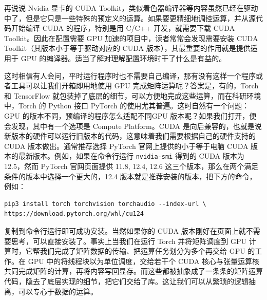 再说说 Nvidia 显卡的 CUDA Toolkit，类似着色器编译器等内容虽然已经在驱动中了，但是它只是一些特殊的预定义的运算。如果要更精细地调控运算，并从源代码开始编译 CUDA 的程序，特别是用 C/C++ 开发，就需要下载 CUDA Toolkit。因此在配置需要 GPU 加速的项目中，读者常常会发现需要安装 CUDA Toolkit（其版本小于等于驱动对应的 CUDA 版本），其最重要的作用就是提供适用于 GPU 的编译器。适当了解对理解配置环境时干了什么是有益的。

这时相信有人会问，平时运行程序时也不需要自己编译，那有没有这样一个程序或者工具可以让我们开箱即用地使用 GPU 完成矩阵运算呢？答案是，有的，Torch 和 TensorFlow 就包装掉了底层的细节，可以方便地完成这些运算，而在科研环境中，Torch 的 Python 接口 PyTorch 的使用尤其普遍。这时自然有一个问题：GPU 的版本不同，预编译的程序怎么适配不同GPU 版本呢？如果我们打开，便会发现，其中有一个选项是 Compute Platform。CUDA 是向后兼容的，也就是说新版本的硬件可以运行旧版本的代码，这意味着我们需要根据自己的硬件支持的 CUDA 版本做出。通常推荐选择 PyTorch 官网上提供的小于等于电脑 CUDA 版本的最新版本。例如，如果在命令行运行 \texttt{nvidia-smi} 得到的 CUDA 版本为 12.5，然而 PyTorch 官网页面提供 11.8, 12.4, 12.6 这三个版本，那么在两个满足条件的版本中选择一个更大的，12.4 版本就是推荐安装的版本，把下方的命令，例如：
\begin{verbatim}
pip3 install torch torchvision torchaudio --index-url \
https://download.pytorch.org/whl/cu124
\end{verbatim}
复制到命令行运行即可成功安装。当然如果你的 CUDA 版本刚好在页面上就不需要思考，可以直接安装了。事实上当我们在运行 Torch 并将矩阵调度到 GPU 计算时，它帮我们完成了矩阵数据的传输、把运算任务划分为多个再交给 GPU 的工作。在 GPU 中的将线程块以为单位调度，交给若干个 CUDA 核心与张量运算核共同完成矩阵的计算，再将内容写回显存。而这些都被抽象成了一条条的矩阵运算代码，隐去了底层实现的细节，把它们交给了库。这让我们可以从繁琐的逻辑抽离，可以专心于数据的运算。
